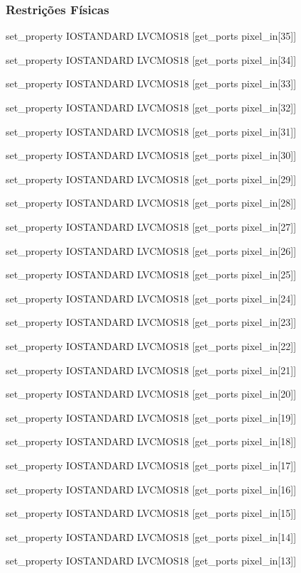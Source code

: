 \subsubsection{Restrições Físicas}\label{ap2:planC_phisical_cnstrs}

set\_property IOSTANDARD LVCMOS18 [get\_ports {pixel\_in[35]}]

set\_property IOSTANDARD LVCMOS18 [get\_ports {pixel\_in[34]}]

set\_property IOSTANDARD LVCMOS18 [get\_ports {pixel\_in[33]}]

set\_property IOSTANDARD LVCMOS18 [get\_ports {pixel\_in[32]}]

set\_property IOSTANDARD LVCMOS18 [get\_ports {pixel\_in[31]}]

set\_property IOSTANDARD LVCMOS18 [get\_ports {pixel\_in[30]}]

set\_property IOSTANDARD LVCMOS18 [get\_ports {pixel\_in[29]}]

set\_property IOSTANDARD LVCMOS18 [get\_ports {pixel\_in[28]}]

set\_property IOSTANDARD LVCMOS18 [get\_ports {pixel\_in[27]}]

set\_property IOSTANDARD LVCMOS18 [get\_ports {pixel\_in[26]}]

set\_property IOSTANDARD LVCMOS18 [get\_ports {pixel\_in[25]}]

set\_property IOSTANDARD LVCMOS18 [get\_ports {pixel\_in[24]}]

set\_property IOSTANDARD LVCMOS18 [get\_ports {pixel\_in[23]}]

set\_property IOSTANDARD LVCMOS18 [get\_ports {pixel\_in[22]}]

set\_property IOSTANDARD LVCMOS18 [get\_ports {pixel\_in[21]}]

set\_property IOSTANDARD LVCMOS18 [get\_ports {pixel\_in[20]}]

set\_property IOSTANDARD LVCMOS18 [get\_ports {pixel\_in[19]}]

set\_property IOSTANDARD LVCMOS18 [get\_ports {pixel\_in[18]}]

set\_property IOSTANDARD LVCMOS18 [get\_ports {pixel\_in[17]}]

set\_property IOSTANDARD LVCMOS18 [get\_ports {pixel\_in[16]}]

set\_property IOSTANDARD LVCMOS18 [get\_ports {pixel\_in[15]}]

set\_property IOSTANDARD LVCMOS18 [get\_ports {pixel\_in[14]}]

set\_property IOSTANDARD LVCMOS18 [get\_ports {pixel\_in[13]}]

